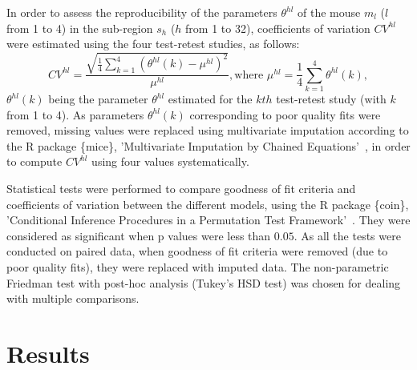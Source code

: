 In order to assess the reproducibility of the parameters $\theta^{hl}$ of the mouse $m_l$ ($l$ from 1 to 4) in the sub-region $s_h$ ($h$ from 1 to 32), coefficients of variation $CV^{hl}$  were estimated using the four test-retest studies, as follows: 
\begin{equation}
{CV^{hl}} = \frac {\sqrt {\frac{1}{4} {\sum _{k=1}^{4} (\theta^{hl}(k)- \mu^{hl})^2}}} {\mu^{hl}}, \textrm {where } \mu^{hl}=\frac{1}{4} \sum _{k=1}^{4} \theta^{hl}(k),
\label{eq:Ch3CV}
\end{equation}
$\theta^{hl}(k)$ being the parameter $\theta^{hl}$ estimated for the $kth$ test-retest study (with $k$ from 1 to 4).
As parameters $\theta^{hl}(k)$ corresponding to poor quality fits were removed, missing values were replaced using multivariate imputation according to the R package \{mice\}, 'Multivariate Imputation by Chained Equations'~\cite{vanBuuren2011ica}, in order to compute $CV^{hl}$ using four values systematically.

Statistical tests were performed to compare goodness of fit criteria and coefficients of variation between the different models, using the R package \{coin\}, 'Conditional Inference Procedures in a Permutation Test Framework'~\cite{Hothorn2008ht}. They were considered as significant when p values were less than $0.05$. As all the tests were conducted on paired data, when goodness of fit criteria were removed (due to poor quality fits), they were replaced with imputed data.
The non-parametric Friedman test with post-hoc analysis (Tukey's HSD test) was chosen for dealing with multiple comparisons. 

\section{Results}
\label{sec:results}
